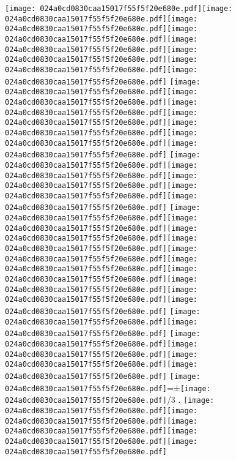 \documentclass{article}
\newcommand{\origpg}[2]{\texttt{[image: 024a0cd0830caa15017f55f5f20e680e.pdf]}}
\begin{document}
{\vspace{0.646pt}\origpg5{85.303pt 451.57pt 92.469pt 467.71pt}\origpg5{92.517pt 451.57pt 100.36pt 467.71pt}\hspace{-0.613pt}\origpg5{99.748pt 451.57pt 107.82pt 467.71pt}\hspace{-0.355pt}\origpg5{107.46pt 451.57pt 115.53pt 467.71pt}\origpg5{115.63pt 451.57pt 123.7pt 467.71pt}\hspace{0.339pt}\origpg5{124.04pt 451.57pt 131.21pt 467.71pt}\origpg5{131.25pt 451.57pt 138.31pt 467.71pt}\origpg5{138.33pt 451.57pt 146.96pt 467.71pt} \origpg5{155.19pt 451.57pt 163.31pt 467.71pt}\origpg5{163.36pt 451.57pt 170.52pt 467.71pt}\hspace{-0.178pt}\origpg5{170.35pt 451.57pt 177.51pt 467.71pt}\origpg5{177.56pt 451.57pt 184.61pt 467.71pt}\origpg5{184.55pt 451.57pt 193.18pt 467.71pt}\origpg5{193.18pt 451.57pt 201.82pt 467.71pt}\origpg5{201.88pt 451.57pt 212.73pt 467.71pt} \origpg5{221.14pt 451.57pt 231.36pt 467.71pt}\origpg5{231.26pt 451.57pt 239.33pt 467.71pt}\hspace{-0.597pt}\origpg5{238.73pt 451.57pt 249.88pt 467.71pt}\hspace{-0.307pt}\origpg5{249.58pt 451.57pt 256.74pt 467.71pt}\hspace{-0.178pt}\origpg5{256.57pt 451.57pt 263.62pt 467.71pt} \origpg5{272.08pt 451.57pt 280.71pt 467.71pt}\origpg5{280.75pt 451.57pt 287.12pt 467.71pt}\hspace{-0.333pt}\origpg5{286.79pt 451.57pt 297.01pt 467.71pt}\origpg5{296.91pt 451.57pt 304.08pt 467.71pt}\hspace{-0.178pt}\origpg5{303.9pt 451.57pt 312.54pt 467.71pt}\origpg5{312.54pt 451.57pt 319.96pt 467.71pt}\origpg5{320.02pt 451.57pt 327.08pt 467.71pt}\hspace{0.161pt}\origpg5{327.24pt 451.57pt 334.6pt 467.71pt}\origpg5{334.7pt 451.57pt 341.86pt 467.71pt}\origpg5{341.91pt 451.57pt 349.34pt 467.71pt} \origpg5{357.55pt 451.57pt 366.19pt 467.71pt}\origpg5{366.19pt 451.57pt 373.35pt 467.71pt} \origpg5{381.84pt 451.57pt 389.91pt 467.71pt}\hspace{-0.355pt}\origpg5{389.56pt 451.57pt 396.17pt 467.71pt}\hspace{-0.597pt}\origpg5{395.58pt 451.57pt 403.65pt 467.71pt}\hspace{-0.113pt}\origpg5{403.53pt 451.57pt 411.59pt 467.71pt} \origpg5{420.3pt 451.57pt 431.23pt 467.71pt}\hspace{4.732pt}=\hspace{4.565pt}±\origpg5{464.63pt 451.57pt 474.2pt 467.71pt}\hspace{0.326pt}/3 . \origpg5{512.1pt 451.57pt 521.96pt 467.71pt}\hspace{-0.71pt}\origpg5{521.25pt 451.57pt 528.42pt 467.71pt}\origpg5{528.47pt 451.57pt 536.31pt 467.71pt}\origpg5{536.41pt 451.57pt 545.05pt 467.71pt}\origpg5{545.05pt 451.57pt 555.26pt 467.71pt} 

}
\end{document}

